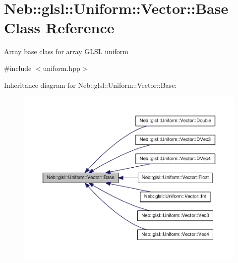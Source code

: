 \hypertarget{classNeb_1_1glsl_1_1Uniform_1_1Vector_1_1Base}{\section{\-Neb\-:\-:glsl\-:\-:\-Uniform\-:\-:\-Vector\-:\-:\-Base \-Class \-Reference}
\label{classNeb_1_1glsl_1_1Uniform_1_1Vector_1_1Base}
}


\-Array base class for array \-G\-L\-S\-L uniform  




{\ttfamily \#include $<$uniform.\-hpp$>$}



\-Inheritance diagram for \-Neb\-:\-:glsl\-:\-:\-Uniform\-:\-:\-Vector\-:\-:\-Base\-:\nopagebreak
\begin{figure}[H]
\begin{center}
\leavevmode
\includegraphics[width=350pt]{classNeb_1_1glsl_1_1Uniform_1_1Vector_1_1Base__inherit__graph}
\end{center}
\end{figure}
